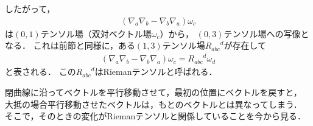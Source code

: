 \documentclass[a4paper]{jsarticle}
\begin{document}
したがって，
\begin{align}
	\left( \nabla_a \nabla_b - \nabla_b \nabla_a \right) \omega_c
\end{align}
は$(0, 1)$テンソル場（双対ベクトル場$\omega_c$）から，
$(0, 3)$テンソル場への写像となる．
これは前節と同様に，ある$(1, 3)$テンソル場${R_{abc}}^d$が存在して
\begin{align}
	\left( \nabla_a \nabla_b - \nabla_b \nabla_a \right) \omega_c
	= {R_{abc}}^d \omega_d
\end{align}
と表される．
この${R_{abc}}^d$はRiemanテンソルと呼ばれる．

閉曲線に沿ってベクトルを平行移動させて，最初の位置にベクトルを戻すと，
大抵の場合平行移動させたベクトルは，もとのベクトルとは異なってしまう．
そこで，そのときの変化がRiemanテンソルと関係していることを今から見る．
\end{document}

